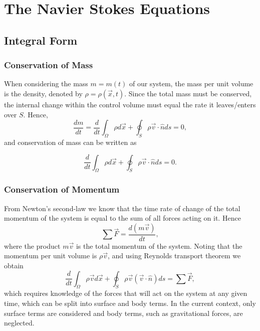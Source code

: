 \chapter{The Navier Stokes Equations} \label{ch:navier_stokes}

\section{Integral Form}
\subsection{Conservation of Mass}
When considering the mass $m = m(t)$ of our system, the mass per unit volume is the density, denoted by $\rho = \rho(\vec{x},t)$. Since the total mass must be conserved, the internal change within the control volume must equal the rate it leaves/enters over $S$. Hence,
\begin{equation}
	\frac{dm}{dt} = \frac{d}{dt}\int_\Omega \rho d\vec{x} + \oint_S \rho \vec{v} \cdot \hat{n} ds = 0,
\end{equation}
and conservation of mass can be written as
\begin{eqBox}
\begin{equation}
	\frac{d}{dt}\int_\Omega \rho d\vec{x} + \oint_S \rho \vec{v} \cdot \hat{n} ds = 0.
\end{equation}
\end{eqBox}

\subsection{Conservation of Momentum}
From Newton's second-law we know that the time rate of change of the total momentum of the system is equal to the sum of all forces acting on it. Hence
\begin{equation}
	\sum \vec{F} = \frac{d(m \vec{v})}{dt},
\end{equation}
where the product $m \vec{v}$ is the total momentum of the system. Noting that the momentum per unit volume is $\rho \vec{v}$, and using Reynolds transport theorem we obtain
\begin{equation}
	 \frac{d}{dt}\int_\Omega \rho \vec{v} d\vec{x} + \oint_S \rho \vec{v} (\vec{v} \cdot \hat{n}) ds = \sum \vec{F},
\end{equation}
which requires knowledge of the forces that will act on the system at any given time, which can be split into surface and body terms. In the current context, only surface terms are considered and body terms, such as gravitational forces, are neglected.

